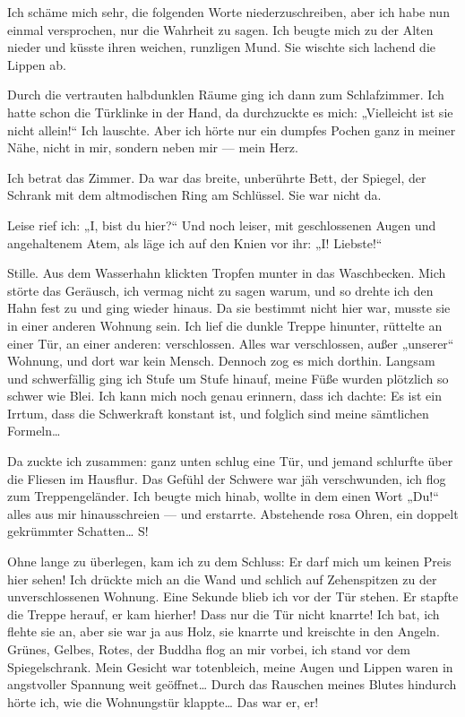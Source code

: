 Ich schäme mich sehr, die folgenden Worte niederzuschreiben, aber
ich habe nun einmal versprochen, nur die Wahrheit zu sagen. Ich
beugte mich zu der Alten nieder und küsste ihren weichen, runzligen
Mund. Sie wischte sich lachend die Lippen ab.

Durch die vertrauten halbdunklen Räume ging ich dann zum
Schlafzimmer. Ich hatte schon die Türklinke in der Hand, da
durchzuckte es mich: „Vielleicht ist sie nicht allein!“ Ich
lauschte. Aber ich hörte nur ein dumpfes Pochen ganz in meiner
Nähe, nicht in mir, sondern neben mir — mein Herz.

Ich betrat das Zimmer. Da war das breite, unberührte Bett, der
Spiegel, der Schrank mit dem altmodischen Ring am Schlüssel. Sie
war nicht da.

Leise rief ich: „I, bist du hier?“ Und noch leiser, mit
geschlossenen Augen und angehaltenem Atem, als läge ich auf den
Knien vor ihr: „I! Liebste!“

Stille. Aus dem Wasserhahn klickten Tropfen munter in das
Waschbecken. Mich störte das Geräusch, ich vermag nicht zu sagen
warum, und so drehte ich den Hahn fest zu und ging wieder hinaus.
Da sie bestimmt nicht hier war, musste sie in einer anderen Wohnung
sein. Ich lief die dunkle Treppe hinunter, rüttelte an einer Tür,
an einer anderen: verschlossen. Alles war verschlossen, außer
„unserer“ Wohnung, und dort war kein Mensch. Dennoch zog es mich
dorthin. Langsam und schwerfällig ging ich Stufe um Stufe hinauf,
meine Füße wurden plötzlich so schwer wie Blei. Ich kann mich noch
genau erinnern, dass ich dachte: Es ist ein Irrtum, dass die
Schwerkraft konstant ist, und folglich sind meine sämtlichen
Formeln\ldots{}

Da zuckte ich zusammen: ganz unten schlug eine Tür, und jemand
schlurfte über die Fliesen im Hausflur. Das Gefühl der Schwere war
jäh verschwunden, ich flog zum Treppengeländer. Ich beugte mich
hinab, wollte in dem einen Wort „Du!“ alles aus mir hinausschreien
— und erstarrte. Abstehende rosa Ohren, ein doppelt gekrümmter
Schatten\ldots{} S!

Ohne lange zu überlegen, kam ich zu dem Schluss: Er darf mich um
keinen Preis hier sehen! Ich drückte mich an die Wand und schlich
auf Zehenspitzen zu der unverschlossenen Wohnung. Eine Sekunde
blieb ich vor der Tür stehen. Er stapfte die Treppe herauf, er kam
hierher! Dass nur die Tür nicht knarrte! Ich bat, ich flehte sie
an, aber sie
war ja aus Holz, sie knarrte und kreischte in den Angeln. Grünes,
Gelbes, Rotes, der Buddha flog an mir vorbei, ich stand vor dem
Spiegelschrank. Mein Gesicht war totenbleich, meine Augen und
Lippen waren in angstvoller Spannung weit geöffnet\ldots{} Durch das
Rauschen meines Blutes hindurch hörte ich, wie die Wohnungstür
klappte\ldots{} Das war er, er!

